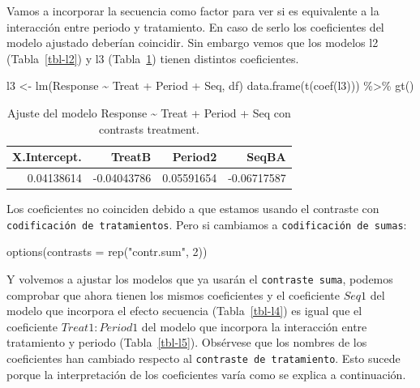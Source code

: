 \documentclass[
  12pt,
  a4paper,
  extrafontsizes,
  onecolumn,
  openright]{memoir}
\newenvironment{Shaded}{\begin{snugshade}}{\end{snugshade}}
\newcommand{\AttributeTok}[1]{\textcolor[rgb]{0.40,0.45,0.13}{#1}}
\newcommand{\DecValTok}[1]{\textcolor[rgb]{0.68,0.00,0.00}{#1}}
\newcommand{\FunctionTok}[1]{\textcolor[rgb]{0.28,0.35,0.67}{#1}}
\newcommand{\NormalTok}[1]{\textcolor[rgb]{0.00,0.23,0.31}{#1}}
\newcommand{\OtherTok}[1]{\textcolor[rgb]{0.00,0.23,0.31}{#1}}
\newcommand{\SpecialCharTok}[1]{\textcolor[rgb]{0.37,0.37,0.37}{#1}}
\newcommand{\StringTok}[1]{\textcolor[rgb]{0.13,0.47,0.30}{#1}}
\begin{document}
Vamos a incorporar la secuencia como factor para ver si es equivalente a
la interacción entre periodo y tratamiento. En caso de serlo los
coeficientes del modelo ajustado deberían coincidir. Sin embargo vemos
que los modelos l2 (Tabla~\ref{tbl-l2}) y l3 (Tabla~\ref{tbl-l3}) tienen
distintos coeficientes.

\scriptsize

\begin{Shaded}
\begin{Highlighting}[]
\NormalTok{l3 }\OtherTok{\textless{}{-}} \FunctionTok{lm}\NormalTok{(Response }\SpecialCharTok{\textasciitilde{}}\NormalTok{ Treat }\SpecialCharTok{+}\NormalTok{ Period }\SpecialCharTok{+}\NormalTok{ Seq, df)}
\FunctionTok{data.frame}\NormalTok{(}\FunctionTok{t}\NormalTok{(}\FunctionTok{coef}\NormalTok{(l3))) }\SpecialCharTok{\%\textgreater{}\%} \FunctionTok{gt}\NormalTok{()}
\end{Highlighting}
\end{Shaded}

\hypertarget{tbl-l3}{}
\begin{longtable}{rrrr}
\caption{\label{tbl-l3}Ajuste del modelo Response \textasciitilde{} Treat + Period + Seq con
contrasts treatment. }\tabularnewline

\toprule
X.Intercept. & TreatB & Period2 & SeqBA \\ 
\midrule
0.04138614 & -0.04043786 & 0.05591654 & -0.06717587 \\ 
\bottomrule
\end{longtable}

\normalsize

Los coeficientes no coinciden debido a que estamos usando el contraste
con \texttt{codificación\ de\ tratamientos}. Pero si cambiamos a
\texttt{codificación\ de\ sumas}:

\scriptsize

\begin{Shaded}
\begin{Highlighting}[]
\FunctionTok{options}\NormalTok{(}\AttributeTok{contrasts =} \FunctionTok{rep}\NormalTok{(}\StringTok{"contr.sum"}\NormalTok{, }\DecValTok{2}\NormalTok{))}
\end{Highlighting}
\end{Shaded}

\normalsize

Y volvemos a ajustar los modelos que ya usarán el
\texttt{contraste\ suma}, podemos comprobar que ahora tienen los mismos
coeficientes y el coeficiente \(Seq1\) del modelo que incorpora el
efecto secuencia (Tabla~\ref{tbl-l4}) es igual que el coeficiente
\(Treat1:Period1\) del modelo que incorpora la interacción entre
tratamiento y periodo (Tabla~\ref{tbl-l5}). Obsérvese que los nombres de
los coeficientes han cambiado respecto al
\texttt{contraste\ de\ tratamiento}. Esto sucede porque la
interpretación de los coeficientes varía como se explica a continuación.
\end{document}
